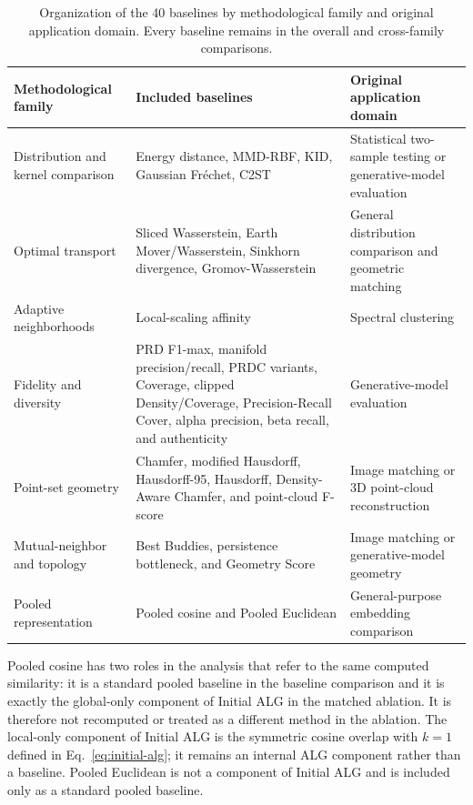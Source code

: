 \documentclass[preprint,12pt]{elsarticle}
\begin{document}
\begin{table}[!htbp]
\centering
\caption{Organization of the 40 baselines by methodological family and original
application domain. Every baseline remains in the overall and cross-family
comparisons.}
\label{tab:baseline-taxonomy}
\small
\begin{tabularx}{\textwidth}{>{\raggedright\arraybackslash}p{}>{\raggedright\arraybackslash}X>{\raggedright\arraybackslash}p{}}
\toprule
Methodological family & Included baselines & Original application domain\\
\midrule
Distribution and kernel comparison & Energy distance, MMD-RBF, KID, Gaussian
Fr\'echet, C2ST & Statistical two-sample testing or generative-model evaluation\\
Optimal transport & Sliced Wasserstein, Earth Mover/Wasserstein, Sinkhorn
divergence, Gromov-Wasserstein & General distribution comparison and geometric matching\\
Adaptive neighborhoods & Local-scaling affinity & Spectral clustering\\
Fidelity and diversity & PRD F1-max, manifold precision/recall, PRDC variants,
Coverage, clipped Density/Coverage, Precision-Recall Cover, alpha precision,
beta recall, and authenticity & Generative-model evaluation\\
Point-set geometry & Chamfer, modified Hausdorff, Hausdorff-95, Hausdorff,
Density-Aware Chamfer, and point-cloud F-score & Image matching or 3D point-cloud reconstruction\\
Mutual-neighbor and topology & Best Buddies, persistence bottleneck, and
Geometry Score & Image matching or generative-model geometry\\
Pooled representation & Pooled cosine and Pooled Euclidean & General-purpose embedding comparison\\
\bottomrule
\end{tabularx}
\end{table}

Pooled cosine has two roles in the analysis that refer to the same computed
similarity: it is a standard pooled baseline in the baseline comparison and it
is exactly the global-only component of Initial ALG in the matched ablation.
It is therefore not recomputed or treated as a different method in the
ablation. The local-only component of Initial ALG is the symmetric cosine
overlap with $k=1$ defined in Eq.~\eqref{eq:initial-alg}; it remains an
internal ALG component rather than a baseline. Pooled Euclidean is not a
component of Initial ALG and is included only as a standard pooled baseline.
\end{document}
